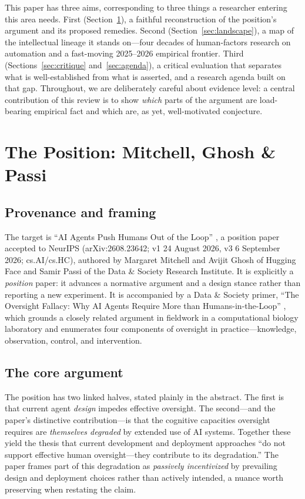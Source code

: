 \documentclass[11pt]{article}
\begin{document}
This paper has three aims, corresponding to three things a researcher entering this area
needs. First (Section~\ref{sec:position}), a faithful reconstruction of the position's
argument and its proposed remedies. Second (Section~\ref{sec:landscape}), a map of the
intellectual lineage it stands on---four decades of human-factors research on automation
and a fast-moving 2025--2026 empirical frontier. Third (Sections~\ref{sec:critique}
and~\ref{sec:agenda}), a critical evaluation that separates what is well-established from
what is asserted, and a research agenda built on that gap. Throughout, we are deliberately
careful about evidence level: a central contribution of this review is to show \emph{which}
parts of the argument are load-bearing empirical fact and which are, as yet, well-motivated
conjecture.

\section{The Position: Mitchell, Ghosh \& Passi}
\label{sec:position}

\subsection{Provenance and framing}

The target is ``AI Agents Push Humans Out of the Loop'' \citep{mitchell2026agents}, a
position paper accepted to NeurIPS (arXiv:2608.23642; v1 24 August 2026, v3 6 September
2026; cs.AI/cs.HC), authored by Margaret Mitchell and Avijit Ghosh of Hugging Face and
Samir Passi of the Data \& Society Research Institute. It is explicitly a \emph{position}
paper: it advances a normative argument and a design stance rather than reporting a new
experiment. It is accompanied by a Data \& Society primer, ``The Oversight Fallacy: Why AI
Agents Require More than Humans-in-the-Loop'' \citep{passi2026oversight}, which grounds a
closely related argument in fieldwork in a computational biology laboratory and enumerates
four components of oversight in practice---knowledge, observation, control, and
intervention.

\subsection{The core argument}

The position has two linked halves, stated plainly in the abstract. The first is that
current agent \emph{design} impedes effective oversight. The second---and the paper's
distinctive contribution---is that the cognitive capacities oversight requires are
\emph{themselves degraded} by extended use of AI systems. Together these yield the thesis
that current development and deployment approaches ``do not support effective human
oversight---they contribute to its degradation.'' The paper frames part of this degradation
as \emph{passively incentivized} by prevailing design and deployment choices rather than
actively intended, a nuance worth preserving when restating the claim.
\end{document}
